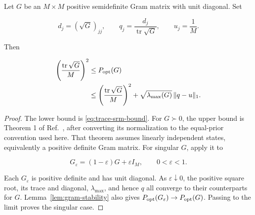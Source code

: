 \begin{lemma}\label{lem:gram-upper-bound}
Let \(G\) be an \(M\times M\) positive semidefinite Gram matrix with unit diagonal. Set

\[
d_j=(\sqrt G)_{jj},\qquad
q_j=\frac{d_j}{\operatorname{tr}\sqrt G},\qquad
u_j=\frac1M.
\]

Then

\begin{align}\label{eq:gram-upper-bound}
\left(\frac{\operatorname{tr}\sqrt G}{M}\right)^2
&\le P_{\rm opt}(G) \notag\\
&\le
\left(\frac{\operatorname{tr}\sqrt G}{M}\right)^2
+\sqrt{\lambda_{\max}(G)}\,\|q-u\|_1.
\end{align}
\end{lemma}

\begin{proof}
The lower bound is \eqref{eq:trace-srm-bound}. For \(G\succ0\), the upper
bound is Theorem 1 of Ref.~\cite{sentis2016}, after converting its
normalization to the equal-prior convention used here. That theorem
assumes linearly independent states, equivalently a positive definite Gram
matrix. For singular \(G\), apply it to

\[
G_\varepsilon=(1-\varepsilon)G+\varepsilon I_M,
\qquad 0<\varepsilon<1.
\]

Each \(G_\varepsilon\) is positive definite and has unit diagonal. As \(\varepsilon\downarrow0\), the positive square root, its trace and diagonal, \(\lambda_{\max}\), and hence \(q\) all converge to their counterparts for \(G\). Lemma~\ref{lem:gram-stability} also gives \(P_{\rm opt}(G_\varepsilon)\to P_{\rm opt}(G)\). Passing to the limit proves the singular case.
\end{proof}

